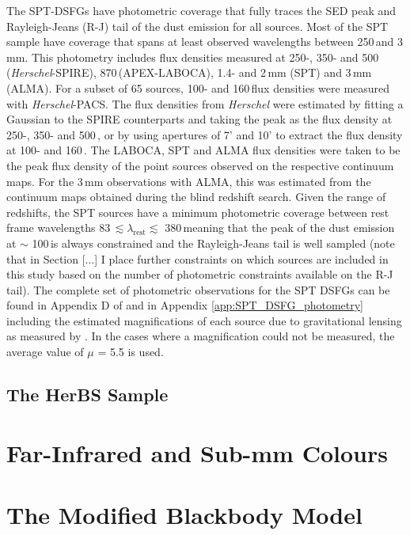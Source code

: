 The SPT-DSFGs have photometric coverage that fully traces the SED peak and Rayleigh-Jeans (R-J) tail of the dust emission for all sources. Most of the SPT sample have coverage that spans at least observed wavelengths between 250\,\micron and 3\,mm. This photometry includes flux densities measured at 250-, 350- and 500\,\micron (\textit{Herschel}-SPIRE), 870\,\micron (APEX-LABOCA), 1.4- and 2\,mm (SPT) and 3\,mm (ALMA). For a subset of 65 sources, 100- and 160\,\micron flux densities were measured with \textit{Herschel}-PACS. The flux densities from \textit{Herschel} were estimated by fitting a Gaussian to the SPIRE counterparts and taking the peak as the flux density at 250-, 350- and 500\,\micron, or by using apertures of 7' and 10' to extract the flux density at 100- and 160\,\micron. The LABOCA, SPT and ALMA flux densities were taken to be the peak flux density of the point sources observed on the respective continuum maps. For the 3\,mm observations with ALMA, this was estimated from the continuum maps obtained during the blind redshift search. Given the range of redshifts, the SPT sources have a minimum photometric coverage between rest frame wavelengths 83\,\micron $\lesssim \lambda_{\textrm{rest}} \lesssim$ 380\,\micron meaning that the peak of the dust emission at $\sim$ 100\,\micron is always constrained and the Rayleigh-Jeans tail is well sampled (note that in Section [...] I place further constraints on which sources are included in this study based on the number of photometric constraints available on the R-J tail). The complete set of photometric observations for the SPT DSFGs can be found in Appendix D of \citealt{Reuter_2020} and in Appendix \ref{app:SPT_DSFG_photometry} including the estimated magnifications of each source due to gravitational lensing as measured by \citealt{Spilker_2016}. In the cases where a magnification could not be measured, the average value of $\mu$ = 5.5 is used.

\subsection{The HerBS Sample}
\section{Far-Infrared and Sub-mm Colours}
\section{The Modified Blackbody Model}
